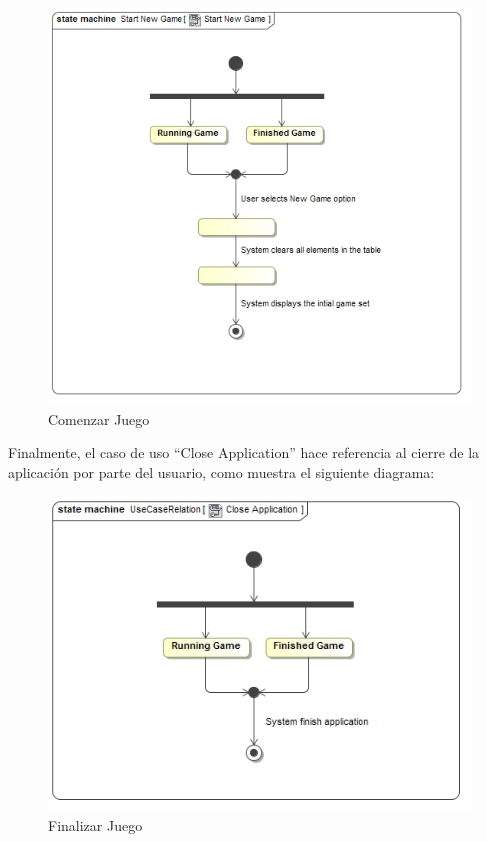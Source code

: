 \documentclass[11pt]{article}
\begin{document}
\begin{center}
 \begin{figure}[H]
 \begin{center}
   \includegraphics[width=15cm]{DomainModel/StartNewGame00.jpg}
   \caption{Comenzar Juego}
   \label{fig:startnewgame}
 \end{center}
 \end{figure}
\end{center}

Finalmente, el caso de uso ``Close Application'' hace referencia al cierre de la aplicación por parte del usuario, como muestra el siguiente diagrama:

\begin{center}
 \begin{figure}[H]
 \begin{center}
   \includegraphics[width=15cm]{DomainModel/CloseApplication00.jpg}
   \caption{Finalizar Juego}
   \label{fig:finishgame}
 \end{center}
 \end{figure}
\end{center}
\end{document}
